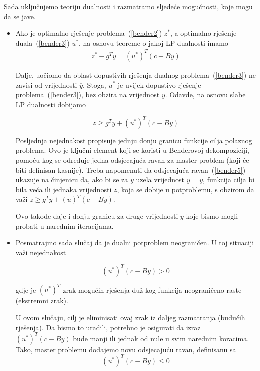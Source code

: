 \documentclass[a4paper, utf8, 11pt, colorlinks]{book}
\begin{document}
Sada uključujemo teoriju dualnosti i razmatramo sljedeće mogućnosti, koje mogu da se jave.
\begin{itemize}
\item Ako je optimalno rješenje problema~(\ref{bender2}) $z^*$, a optimalno rješenje duala~(\ref{bender3}) $u^*$, na osnovu teoreme o jakoj LP dualnosti imamo
  \begin{equation}
	\begin{aligned}\label{bender4}
z^*-g^Ty=(u^*)^T(c-B\overline{y})
	\end{aligned}
\end{equation}


Dalje, uočiomo da oblast dopustivih rješenja dualnog problema~(\ref{bender3}) ne zavisi od vrijednosti $\overline{y}$. Stoga, $u^*$ je uvijek dopustivo rješenje problema~(\ref{bender3}), bez obzira na vrijednost $\overline{y}$. Odavde, na osnovu slabe LP dualnosti dobijamo

  \begin{equation}
\label{bender5}
		z\geqslant g^Ty+(u^*)^T(c-By)
\end{equation}


Posljednja nejednakost propisuje jednju donju granicu funkcije cilja polaznog problema. Ovo je ključni element koji se koristi u Benderovoj dekompoziciji, pomoću kog se određuje jedna odsjecajuća ravan za master problem (koji će biti definisan kasnije). Treba napomenuti da odsjecajuća ravan~(\ref{bender5}) ukazuje na činjenicu da, ako bi se za $y$ uzela vrijednost $y=\overline{y}$, funkcija cilja bi bila veća ili jednaka vrijednosti $\overline{z}$, koja se dobije u potproblemu, s obzirom da važi $	z\geqslant g^Ty+(u)^T(c-B\overline{y})$.

Ovo takođe daje i donju granicu za druge vrijednosti $y$ koje bismo mogli probati u narednim iteracijama.

\item Posmatrajmo sada slučaj da je dualni potproblem neograničen. U toj situaciji važi nejednakost


\begin{equation}
	\label{bender6}
	(u^*)^T(c-By)>0
\end{equation}

gdje je ${(u^*)}^T$ zrak mogućih rješenja duž kog funkcija neograničeno raste (ekstremni zrak).

U ovom slučaju, cilj je eliminisati ovaj zrak iz daljeg razmatranja (budućih rješenja). Da bismo to uradili, potrebno je osigurati da izraz $(u^*)^T(c-By)$ bude manji ili jednak od nule u svim narednim koracima. Tako, master problemu dodajemo novu odsjecajuću ravan, definisanu sa
\begin{equation}
	\label{bender7}
	(u^*)^T(c-By)\leqslant 0
\end{equation}

\end{itemize}
 
\end{document}
